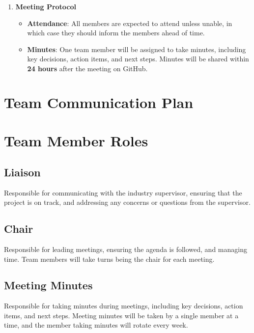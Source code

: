 \documentclass{article}
\begin{document}
\begin{enumerate}[label=\textbf{\arabic*}]
    \item \textbf{Meeting Protocol}
    \begin{itemize}
        \item \textbf{Attendance}: All members are expected to attend unless unable, in which case they should inform the members ahead of time.
        \item \textbf{Minutes}: One team member will be assigned to take minutes, including key decisions, action items, and next steps. Minutes will be shared within \textbf{24 hours} after the meeting on GitHub.
    \end{itemize}

\end{enumerate}


\section{Team Communication Plan}


\section{Team Member Roles}


\subsection*{Liaison} Responsible for communicating with the industry supervisor, ensuring that the project is on track, and addressing any concerns or questions from the supervisor.   
\subsection*{Chair} Responsible for leading meetings, ensuring the agenda is followed, and managing time. Team members will take turns being the chair for each meeting.
\subsection*{Meeting Minutes} Responsible for taking minutes during meetings, including key decisions, action items, and next steps. Meeting minutes will be taken by a single member at a time, and the member taking minutes will rotate every week.
\end{document}
